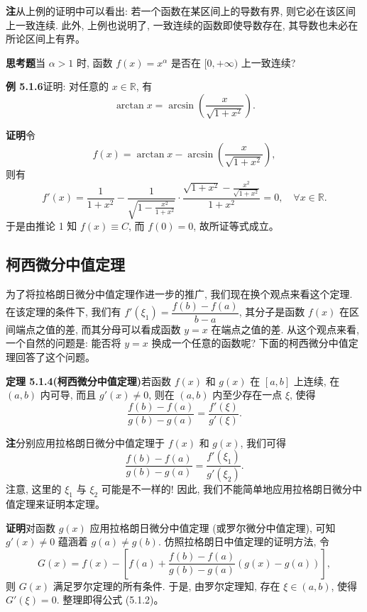 \documentclass[UTF8, 12pt, fontset=fandol, oneside]{ctexart}
\begin{document}
\noindent\textbf{注}\quad 从上例的证明中可以看出: 若一个函数在某区间上的导数有界, 则它必在该区间上一致连续. 此外, 上例也说明了, 一致连续的函数即使导数存在, 其导数也未必在所论区间上有界。

\noindent\textbf{思考题}\quad 当 $\alpha>1$ 时, 函数 $f(x)=x^\alpha$ 是否在 $[0,+\infty)$ 上一致连续?

\noindent\textbf{例 5.1.6}\quad 证明: 对任意的 $x\in\mathbb{R}$, 有
\[
  \arctan x=\arcsin\left(\frac{x}{\sqrt{1+x^2}}\right).
\]

\noindent\textbf{证明}\quad 令
\[
  f(x)=\arctan x-\arcsin\left(\frac{x}{\sqrt{1+x^2}}\right),
\]
则有
\[
  f'(x)
  =
  \frac1{1+x^2}
  -
  \frac1{\sqrt{1-\frac{x^2}{1+x^2}}}
  \cdot
  \frac{\sqrt{1+x^2}-\frac{x^2}{\sqrt{1+x^2}}}{1+x^2}
  =
  0,\quad \forall x\in\mathbb{R}.
\]
于是由推论 1 知 $f(x)\equiv C$, 而 $f(0)=0$, 故所证等式成立。

\subsection{柯西微分中值定理}

为了将拉格朗日微分中值定理作进一步的推广, 我们现在换个观点来看这个定理. 在该定理的条件下, 我们有 $f'(\xi_1)=\dfrac{f(b)-f(a)}{b-a}$, 其分子是函数 $f(x)$ 在区间端点之值的差, 而其分母可以看成函数 $y=x$ 在端点之值的差. 从这个观点来看, 一个自然的问题是: 能否将 $y=x$ 换成一个任意的函数呢? 下面的柯西微分中值定理回答了这个问题。

\noindent\textbf{定理 5.1.4(柯西微分中值定理)}\quad 若函数 $f(x)$ 和 $g(x)$ 在 $[a,b]$ 上连续, 在 $(a,b)$ 内可导, 而且 $g'(x)\ne0$, 则在 $(a,b)$ 内至少存在一点 $\xi$, 使得
\begin{equation}
  \frac{f(b)-f(a)}{g(b)-g(a)}=\frac{f'(\xi)}{g'(\xi)}.
  \tag{5.1.2}
\end{equation}

\noindent\textbf{注}\quad 分别应用拉格朗日微分中值定理于 $f(x)$ 和 $g(x)$, 我们可得
\[
  \frac{f(b)-f(a)}{g(b)-g(a)}=\frac{f'(\xi_1)}{g'(\xi_2)}.
\]
注意, 这里的 $\xi_1$ 与 $\xi_2$ 可能是不一样的! 因此, 我们不能简单地应用拉格朗日微分中值定理来证明本定理。

\noindent\textbf{证明}\quad 对函数 $g(x)$ 应用拉格朗日微分中值定理 (或罗尔微分中值定理), 可知 $g'(x)\ne0$ 蕴涵着 $g(a)\ne g(b)$. 仿照拉格朗日中值定理的证明方法, 令
\[
  G(x)=f(x)-\left[f(a)+\frac{f(b)-f(a)}{g(b)-g(a)}(g(x)-g(a))\right],
\]
则 $G(x)$ 满足罗尔定理的所有条件. 于是, 由罗尔定理知, 存在 $\xi\in(a,b)$, 使得 $G'(\xi)=0$. 整理即得公式 (5.1.2)。
\end{document}
